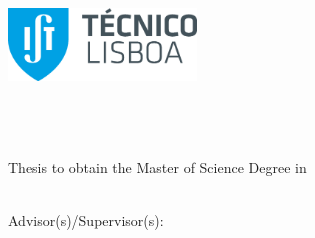 
\begin{titlepage}
\includegraphics[width=5cm]{images/ist_logo}~\\[2.0cm]
\begin{center}
{\LARGE \textbf{\Title}}\\[1.0cm]
{\Large \Subtitle}\\[1.0cm]
{\Large \textbf{\StudentName}}\\[1.0cm]
{\large Thesis to obtain the Master of Science Degree in}\\[1.0cm]
{\LARGE \textbf{\DegreeName}}\\[1.0cm]

\begin{minipage}[t]{.5\textwidth}
  \begin{flushright}
    {\large Advisor(s)/Supervisor(s):\:}
  \end{flushright}
\end{minipage}%
\begin{minipage}[t]{.5\textwidth}
  \begin{flushleft}
    {\Supervisors}
  \end{flushleft}
\end{minipage}\\[1.0cm]


\end{center}
\end{titlepage}
